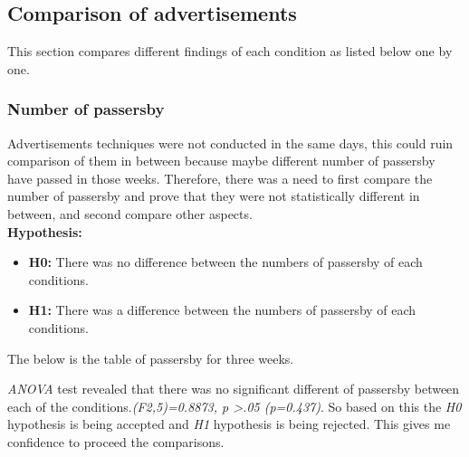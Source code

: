 \newpage
\subsection{Comparison of advertisements}
This section compares different findings of each condition as listed below one by one. 

\subsubsection {Number of passersby}
Advertisements techniques were not conducted in the same days, this could ruin comparison of them in between because maybe different number of passersby have passed in those weeks. Therefore, there was a need to first compare the number of passersby and prove that they were not statistically different in between, and second compare other aspects. \\

\textbf{Hypothesis:}
\begin{itemize}
\item \textbf{H0:} There was no difference between the numbers of passersby of each conditions.
\item \textbf{H1:} There was a difference between the numbers of passersby of each conditions.
\end{itemize}

The below is the table of passersby for three weeks.

\begin{table}[H]
\caption{Number of passersby in three weeks}
\label{tab:passerbyofthreeweeks}
\centering
{}
\end{table}

\emph{ANOVA} test revealed that there was no significant different of passersby between each of the conditions.\emph{(F2,5)=0.8873, p >.05 (p=0.437)}. So based on this the \emph{H0} hypothesis is being accepted and \emph{H1} hypothesis is being rejected. This gives me confidence to proceed the comparisons.


